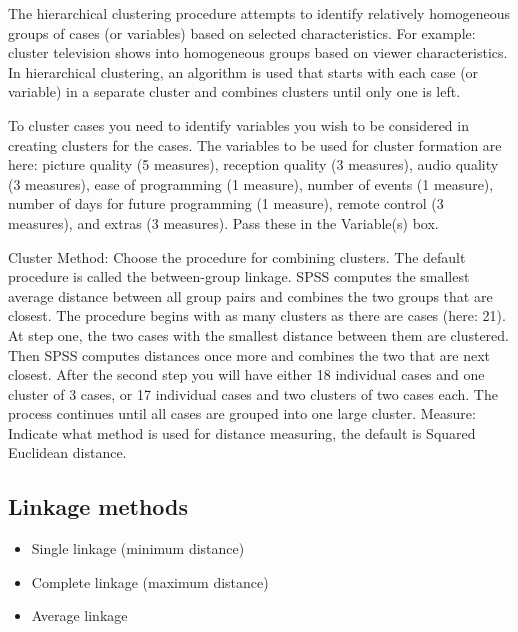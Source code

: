 \documentclass[a4paper,12pt]{article}
\begin{document}
	
	
	
	
	\tableofcontents
	\newpage




The hierarchical clustering procedure attempts to identify relatively homogeneous groups of cases (or variables) based on selected
characteristics. For example: cluster television shows into homogeneous groups based on viewer
characteristics. In hierarchical clustering, an algorithm is used that starts with each case (or variable) in a
separate cluster and combines clusters until only one is left.



To cluster cases you need to identify variables you wish to be considered in creating clusters for the cases.
The variables to be used for cluster formation are here: picture quality (5 measures), reception quality (3
measures), audio quality (3 measures), ease of programming (1 measure), number of events (1 measure),
number of days for future programming (1 measure), remote control (3 measures), and extras (3 measures).
Pass these in the Variable(s) box.

Cluster Method: Choose the procedure for combining clusters. The default procedure is called the
between-group linkage. SPSS computes the smallest average distance between all group pairs and
combines the two groups that are closest. The procedure begins with as many clusters as there are cases
(here: 21). At step one, the two cases with the smallest distance between them are clustered. Then SPSS
computes distances once more and combines the two that are next closest. After the second step you will
have either 18 individual cases and one cluster of 3 cases, or 17 individual cases and two clusters of two
cases each. The process continues until all cases are grouped into one large cluster.
Measure: Indicate what method is used for distance measuring, the default is Squared Euclidean distance. 

\subsection{Linkage methods}
\begin{itemize}
	\item  Single linkage (minimum distance)
	\item  Complete linkage (maximum distance)
	\item  Average linkage
\end{itemize}
\end{document}

